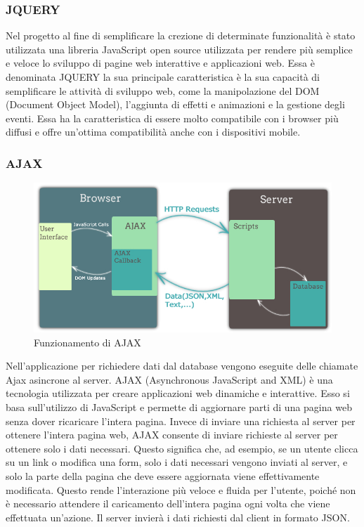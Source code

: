 \documentclass[a4paper,final,12pt]{report}
\begin{document}
\subsubsection{JQUERY}
Nel progetto al fine di semplificare la crezione di determinate funzionalità è stato utilizzata una libreria JavaScript open source utilizzata per rendere più semplice e veloce lo sviluppo di pagine web interattive e applicazioni web. Essa è denominata JQUERY la sua principale caratteristica è la sua capacità di semplificare le attività di sviluppo web, come la manipolazione del DOM (Document Object Model), l'aggiunta di effetti e animazioni e la gestione degli eventi. Essa ha la caratteristica di essere molto compatibile con i browser più diffusi e offre un'ottima compatibilità anche con i dispositivi mobile.
\subsubsection{AJAX}
\begin{figure}[hbtp]
\centering
\includegraphics[scale=0.45]{img_concettuale/ajax.jpg}
\caption{Funzionamento di AJAX}
\end{figure} 
Nell'applicazione per richiedere dati dal database vengono eseguite delle chiamate Ajax asincrone al server. AJAX (Asynchronous JavaScript and XML) è una tecnologia utilizzata per creare applicazioni web dinamiche e interattive. Esso si basa sull'utilizzo di JavaScript e permette di aggiornare parti di una pagina web senza dover ricaricare l'intera pagina.
Invece di inviare una richiesta al server per ottenere l'intera pagina web, AJAX consente di inviare richieste al server per ottenere solo i dati necessari. Questo significa che, ad esempio, se un utente clicca su un link o modifica una form, solo i dati necessari vengono inviati al server, e solo la parte della pagina che deve essere aggiornata viene effettivamente modificata. Questo rende l'interazione più veloce e fluida per l'utente, poiché non è necessario attendere il caricamento dell'intera pagina ogni volta che viene effettuata un'azione.
Il server invierà i dati richiesti dal client in formato JSON.
\end{document}
